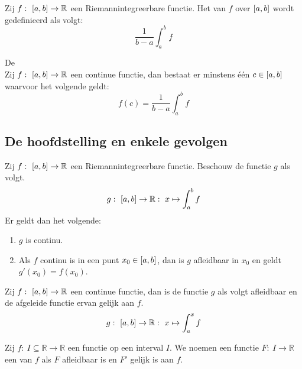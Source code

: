 \documentclass[main.tex]{subfiles}
\begin{document}
\begin{de}
  Zij $f:\ \interval{a}{b} \rightarrow \mathbb{R}$ een Riemannintegreerbare functie.
  Het  van $f$ over $\interval{a}{b}$ wordt gedefinieerd als volgt:
  \[ \frac{1}{b-a} \int_{a}^{b}f \]
\end{de}

\begin{bst}
  De \\
  Zij $f:\ \interval{a}{b} \rightarrow \mathbb{R}$ een continue functie, dan bestaat er minstens \'e\'en $c\in \interval{a}{b}$ waarvoor het volgende geldt:
  \[ f(c) = \frac{1}{b-a} \int_{a}^{b}f \]
\end{bst}

\subsection{De hoofdstelling en enkele gevolgen}
\label{sec:de-hoofdstelling-en}

\begin{bst}
  Zij $f:\ \interval{a}{b} \rightarrow \mathbb{R}$ een Riemannintegreerbare functie.
  Beschouw de functie $g$ als volgt.
  \[ g:\ \interval{a}{b} \rightarrow \mathbb{R}:\ x \mapsto \int_{a}^{b}f \]
  Er geldt dan het volgende:
  \begin{enumerate}
  \item $g$ is continu.
  \item Als $f$ continu is in een punt $x_{0}\in \interval{a}{b}$, dan is $g$ afleidbaar in $x_{0}$ en geldt $g'(x_{0}) = f(x_{0})$.
  \end{enumerate}
\end{bst}

\begin{bst}
  Zij $f:\ \interval{a}{b} \rightarrow \mathbb{R}$ een continue functie, dan is de functie $g$ als volgt afleidbaar en de afgeleide functie ervan gelijk aan $f$.
  \[ g:\ \interval{a}{b} \rightarrow \mathbb{R}:\ x \mapsto \int_{a}^{x}f \]
\end{bst}

\begin{de}
  Zij $f:\ I \subseteq \mathbb{R} \rightarrow \mathbb{R}$ een functie op een interval $I$.
  We noemen een functie $F:\ I \rightarrow \mathbb{R}$ een  van $f$ als $F$ afleidbaar is en $F'$ gelijk is aan $f$.
\end{de}
\end{document}
